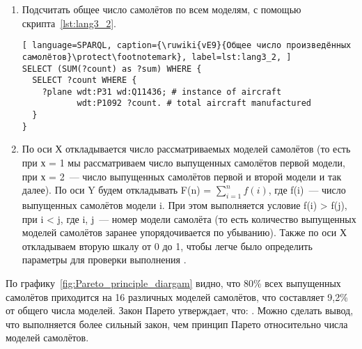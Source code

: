 \begin{enumerate} 
  \item Подсчитать общее число самолётов по всем моделям, с помощью скрипта~\ref{lst:lang3_2}.
  
  
\begin{lstlisting}[ language=SPARQL, caption={\ruwiki{vE9}{Общее число произведённых самолётов}\protect\footnotemark}, label=lst:lang3_2, ]
SELECT (SUM(?count) as ?sum) WHERE {
  SELECT ?count WHERE {
    ?plane wdt:P31 wd:Q11436; # instance of aircraft
		   wdt:P1092 ?count. # total aircraft manufactured
  }
}
\end{lstlisting}
  
  
  \item По оси Х откладывается число рассматриваемых моделей самолётов (то есть при х = 1 мы рассматриваем число выпущенных самолётов первой модели, при х = 2~--- число выпущенных самолётов первой и второй модели и так далее). По оси Y будем откладывать F(n) = $\sum\limits_{i=1}^n f(i)$, где f(i)~--- число выпущенных самолётов модели i. При этом выполняется условие f(i) > f(j), при i < j, где i, j~--- номер модели самолёта (то есть количество выпущенных моделей самолётов заранее упорядочивается по убыванию). Также по оси Х откладываем вторую шкалу от 0 до 1, чтобы легче было определить параметры для проверки выполнения .
\end{enumerate}

\begin{figure*}[h]

    \setlength{\fboxsep}{0pt}%
    \setlength{\fboxrule}{1pt}%

	\caption{Процентное соотношение количества выпущенных моделей самолётов по n моделям к общему числу выпущенных самолётов за всё время, 2020.}%
    \label{fig:Pareto_principle_diargam}%
\end{figure*}

По графику~\ref{fig:Pareto_principle_diargam} видно, что 80\% всех выпущенных самолётов приходится на 16 различных моделей самолётов, что составляет 9,2\% от общего числа моделей. Закон Парето утверждает, что: . Можно сделать вывод, что выполняется более сильный закон, чем принцип Парето относительно числа моделей самолётов.

